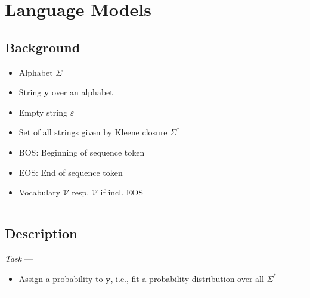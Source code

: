 \section{Language Models}
\subsection*{Background}
\begin{itemize}
    \item Alphabet $\Sigma$
    \item String $\boldsymbol{y}$ over an alphabet 
    \item Empty string $\varepsilon$
    \item Set of all strings given by Kleene closure $\Sigma^*$ 
    \item BOS: Beginning of sequence token
    \item EOS: End of sequence token
    \item Vocabulary $\mathcal{V}$ resp. $\bar{\mathcal{V}}$ if incl. EOS
\end{itemize}

{\color{black}\hrule height 0.001mm}

\subsection*{Description}
\emph{Task} --- 
\begin{itemize}
    \item Assign a probability to $\boldsymbol{y}$, i.e., fit a probability distribution over all $\Sigma^*$
\end{itemize}

{\color{black}\hrule height 0.001mm}

